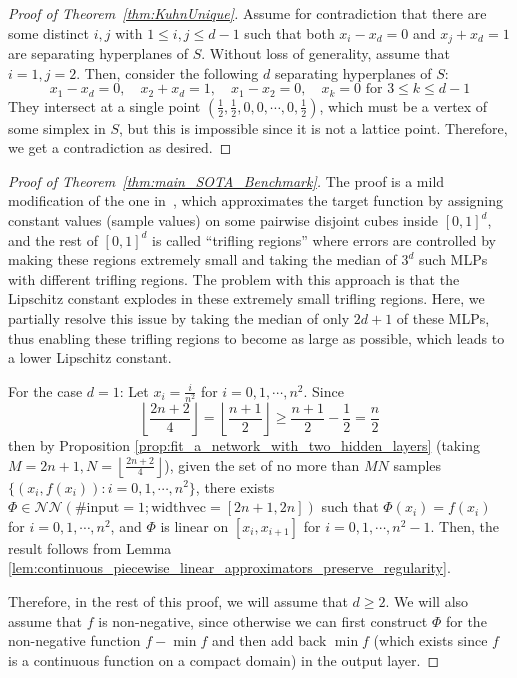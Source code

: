 \documentclass{article}
\numberwithin{equation}{section}
\theoremstyle{definition}
\begin{document}
\begin{proof}[{Proof of Theorem~\ref{thm:KuhnUnique}}]
Assume for contradiction that there are some distinct $i,j$ with $1\le i,j\le d-1$ such that both $x_i-x_d=0$ and $x_j+x_d=1$ are separating hyperplanes of $S$. Without loss of generality, assume that $i=1,j=2$. Then, consider the following $d$ separating hyperplanes of $S$:
$$x_1 - x_d = 0, \quad 
x_2 + x_d = 1, \quad
x_1 - x_2 = 0, \quad
x_k = 0 \text{ for } 3\le k\le d-1 $$
They intersect at a single point 
$\left( \frac{1}{2}, \frac{1}{2}, 0,0,\cdots,0, \frac{1}{2} \right)$, which must be a vertex of some simplex in $S$, but this is impossible since it is not a lattice point. Therefore, we get a contradiction as desired. 
\end{proof}


\begin{proof}[{Proof of Theorem~\ref{thm:main_SOTA_Benchmark}}]
The proof is a mild modification of the one in~\cite{ShenYangZhang_JMPA_OptApprx_ReLU}, 
which approximates the target function by assigning constant values (sample values) on some pairwise disjoint cubes inside $[0,1]^d$, and the rest of $[0,1]^d$ is called ``trifling regions'' where errors are controlled by making these regions extremely small and taking the median of $3^d$ such MLPs with different trifling regions. The problem with this approach is that the Lipschitz constant explodes in these extremely small trifling regions. Here, we partially resolve this issue by taking the median of only $2d+1$ of these MLPs, thus enabling these trifling regions to become as large as possible, which leads to a lower Lipschitz constant. 

For the case $d=1$: Let $x_i=\frac{i}{n^2}$ for $i=0,1,\cdots,n^2$. Since
\[
    \left\lfloor
        \frac{2n+2}{4}
    \right\rfloor
    =
    \left\lfloor
        \frac{n+1}{2}
    \right\rfloor
    \ge
    \frac{n+1}{2} - \frac{1}{2}
    =
    \frac{n}{2}
\]
then by Proposition \ref{prop:fit_a_network_with_two_hidden_layers} (taking $M=2n+1,N=\left\lfloor \frac{2n+2}{4} \right\rfloor$), given the set of no more than $MN$ samples $\{(x_i,f(x_i)): i=0,1,\cdots,n^2 \}$, there exists $\Phi\in\mathcal{NN}(\#\text{input}=1;\text{widthvec}=[2n+1,2n])$ such that $\Phi(x_i)=f(x_i)$ for $i=0,1,\cdots,n^2$, and $\Phi$ is linear on $[x_i,x_{i+1}]$ for $i=0,1,\cdots,n^2-1$. Then, the result follows from Lemma \ref{lem:continuous_piecewise_linear_approximators_preserve_regularity}.

Therefore, in the rest of this proof, we will assume that $d\ge 2$. We will also assume that $f$ is non-negative, since otherwise we can first construct $\Phi$ for the non-negative function $f-\min{f}$ and then add back $\min{f}$ (which exists since $f$ is a continuous function on a compact domain) in the output layer. 


\end{proof}
\end{document}
